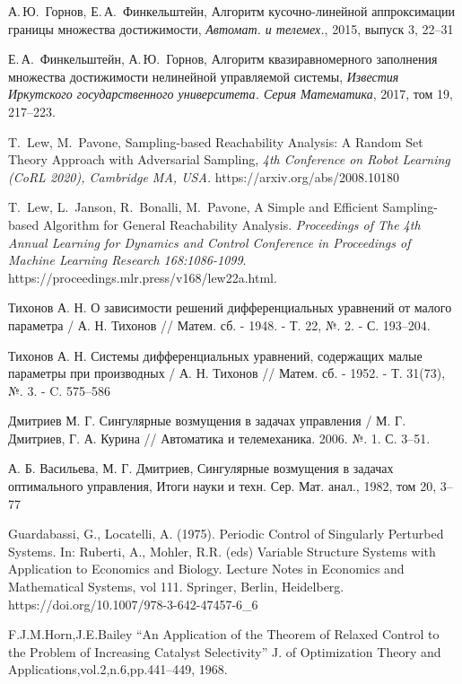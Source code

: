 \documentclass[../main.tex]{subfiles}
\begin{document}
\begin{thebibliography}{99}
А.\,Ю.~Горнов, Е.\,А.~Финкельштейн, Алгоритм кусочно-линейной аппроксимации границы множества достижимости, {\it Автомат. и телемех.}, 2015, выпуск 3, 22–31

Е.\,А.~Финкельштейн, А.\,Ю.~Горнов, Алгоритм квазиравномерного заполнения множества достижимости нелинейной управляемой системы, {\it Известия Иркутского государственного университета. Серия Математика}, 2017, том 19, 217–223.

T.~Lew, M.~Pavone, Sampling-based Reachability Analysis: A Random Set Theory Approach with Adversarial Sampling, {\it 4th Conference on Robot Learning (CoRL 2020), Cambridge MA, USA.} https://arxiv.org/abs/2008.10180 

T.~Lew, L.~Janson, R.~Bonalli, M.~Pavone,  A Simple and Efficient Sampling-based Algorithm for General Reachability Analysis. {\it Proceedings of The 4th Annual Learning for Dynamics and Control Conference in Proceedings of Machine Learning Research
	168:1086-1099}. https://proceedings.mlr.press/v168/lew22a.html.
	
Тихонов А. Н. О зависимости решений дифференциальных уравнений от малого параметра / А. Н. Тихонов // Матем. сб. - 1948. - Т. 22, №. 2. - С. 193–204.

Тихонов А. Н. Системы дифференциальных уравнений, содержащих малые параметры при производных / А. Н. Тихонов // Матем. сб. - 1952. - Т. 31(73), №.
3. - C. 575–586

Дмитриев М. Г. Сингулярные возмущения в задачах управления / М. Г. Дмитриев, Г. А. Курина // Автоматика и телемеханика.  2006.  №. 1.  С. 3–51.

А. Б. Васильева, М. Г. Дмитриев, Сингулярные возмущения в задачах оптимального управления, Итоги науки и техн. Сер. Мат. анал., 1982, том 20, 3–77

Guardabassi, G., Locatelli, A. (1975). Periodic Control of Singularly Perturbed Systems. In: Ruberti, A., Mohler, R.R. (eds) Variable Structure Systems with Application to Economics and Biology. Lecture Notes in Economics and Mathematical Systems, vol 111. Springer, Berlin, Heidelberg. https://doi.org/10.1007/978-3-642-47457-6\_6

F.J.M.Horn,J.E.Bailey “An Application of the Theorem of Relaxed Control to the Problem of Increasing Catalyst Selectivity” J. of Optimization Theory and Applications,vol.2,n.6,pp.441–449, 1968.


\end{thebibliography}
\end{document}
